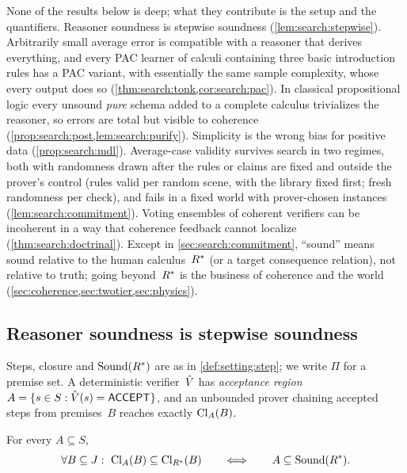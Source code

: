 None of the results below is deep; what they contribute is the setup and the quantifiers. Reasoner soundness is stepwise soundness (\cref{lem:search:stepwise}). Arbitrarily small average error is compatible with a reasoner that derives everything, and every PAC learner of calculi containing three basic introduction rules has a PAC variant, with essentially the same sample complexity, whose every output does so (\cref{thm:search:tonk,cor:search:pac}). In classical propositional logic every unsound \emph{pure} schema added to a complete calculus trivializes the reasoner, so errors are total but visible to coherence (\cref{prop:search:post,lem:search:purify}). Simplicity is the wrong bias for positive data (\cref{prop:search:mdl}). Average-case validity survives search in two regimes, both with randomness drawn after the rules or claims are fixed and outside the prover's control (rules valid per random scene, with the library fixed first; fresh randomness per check), and fails in a fixed world with prover-chosen instances (\cref{lem:search:commitment}). Voting ensembles of coherent verifiers can be incoherent in a way that coherence feedback cannot localize (\cref{thm:search:doctrinal}). Except in \cref{sec:search:commitment}, ``sound'' means sound relative to the human calculus~$R^{*}$ (or a target consequence relation), not relative to truth; going beyond~$R^{*}$ is the business of coherence and the world (\cref{sec:coherence,sec:twotier,sec:physics}).

\subsection{Reasoner soundness is stepwise soundness}\label{sec:search:stepwise}

Steps, closure and $\mathrm{Sound}(R^{*})$ are as in \cref{def:setting:step}; we write $\Pi$ for a premise set. A deterministic verifier~$\hat V$ has \emph{acceptance region} $A=\{s\in S:\hat V(s)=\textsf{ACCEPT}\}$, and an unbounded prover chaining accepted steps from premises~$B$ reaches exactly $\mathrm{Cl}_A(B)$.

\begin{lemma}\label{lem:search:stepwise}
For every $A\subseteq S$,
\[
\forall B\subseteq J:\ \Cl_A(B)\subseteq\Cl_{\Rstar}(B)
\qquad\Longleftrightarrow\qquad
A\subseteq\Sound(\Rstar).
\]
\hfill{}
\end{lemma}

